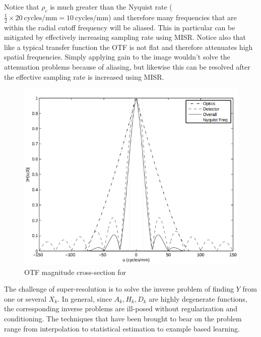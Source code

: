%
Notice that $\rho_c$ is much greater than the Nyquist rate ($\frac{1}{2} \times 20~\text{cycles}/\text{mm} = 10~\text{cycles}/\text{mm}$) and therefore many frequencies that are within the radial cutoff frequency will be aliased.
%
This in particular can be mitigated by effectively increasing sampling rate using MISR.
%
Notice also that like a typical transfer function the OTF is not flat and therefore attenuates high spatial frequencies.
%
Simply applying gain to the image wouldn't solve the attenuation problems because of aliasing, but likewise this can be resolved after the effective sampling rate is increased using MISR.
\begin{figure}
    \includegraphics[width=.7\linewidth,keepaspectratio]{figures/mtf.png}
    \caption{OTF magnitude cross-section for\cite{milanfar2017super}}
    \label{fig:mtf}
\end{figure}

The challenge of super-resolution is to solve the inverse problem of finding $Y$ from one or several $X_k$.
%
In general, since $A_k, H_k, D_k$ are highly degenerate functions, the corresponding inverse problems are ill-posed without regularization and conditioning.
%
The techniques that have been brought to bear on the problem range from interpolation to statistical estimation to example based learning.

